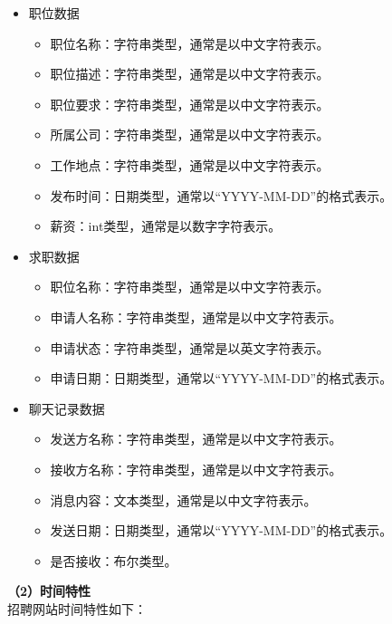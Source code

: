 \documentclass[UTF8,a4paper,10pt]{ctexart}
\begin{document}
\begin{itemize}
\begin{itemize}
        \end{itemize}
    \item 职位数据
        \begin{itemize}
                \item 职位名称：字符串类型，通常是以中文字符表示。
                \item 职位描述：字符串类型，通常是以中文字符表示。
                \item 职位要求：字符串类型，通常是以中文字符表示。
                \item 所属公司：字符串类型，通常是以中文字符表示。
                \item 工作地点：字符串类型，通常是以中文字符表示。
                \item 发布时间：日期类型，通常以“YYYY-MM-DD”的格式表示。
                \item 薪资：int类型，通常是以数字字符表示。
        \end{itemize}
    \item 求职数据
        \begin{itemize}
                    \item 职位名称：字符串类型，通常是以中文字符表示。
                    \item 申请人名称：字符串类型，通常是以中文字符表示。
                    \item 申请状态：字符串类型，通常是以英文字符表示。
                    \item 申请日期：日期类型，通常以“YYYY-MM-DD”的格式表示。
        \end{itemize}
    \item 聊天记录数据
        \begin{itemize}
                        \item 发送方名称：字符串类型，通常是以中文字符表示。
                        \item 接收方名称：字符串类型，通常是以中文字符表示。
                        \item 消息内容：文本类型，通常是以中文字符表示。
                        \item 发送日期：日期类型，通常以“YYYY-MM-DD”的格式表示。
                        \item 是否接收：布尔类型。
        \end{itemize}
\end{itemize}

\textbf{（2）时间特性}\\
招聘网站时间特性如下：
\end{document}
